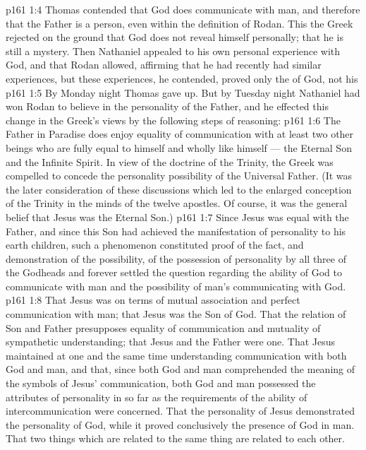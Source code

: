 \vs p161 1:4 Thomas contended that God does communicate with man, and therefore that the Father is a person, even within the definition of Rodan. This the Greek rejected on the ground that God does not reveal himself personally; that he is still a mystery. Then Nathaniel appealed to his own personal experience with God, and that Rodan allowed, affirming that he had recently had similar experiences, but these experiences, he contended, proved only the  of God, not his 
\vs p161 1:5 By Monday night Thomas gave up. But by Tuesday night Nathaniel had won Rodan to believe in the personality of the Father, and he effected this change in the Greek’s views by the following steps of reasoning:
\vs p161 1:6 \bibnobreakspace The Father in Paradise does enjoy equality of communication with at least two other beings who are fully equal to himself and wholly like himself --- the Eternal Son and the Infinite Spirit. In view of the doctrine of the Trinity, the Greek was compelled to concede the personality possibility of the Universal Father. (It was the later consideration of these discussions which led to the enlarged conception of the Trinity in the minds of the twelve apostles. Of course, it was the general belief that Jesus was the Eternal Son.)
\vs p161 1:7 \bibnobreakspace Since Jesus was equal with the Father, and since this Son had achieved the manifestation of personality to his earth children, such a phenomenon constituted proof of the fact, and demonstration of the possibility, of the possession of personality by all three of the Godheads and forever settled the question regarding the ability of God to communicate with man and the possibility of man’s communicating with God.
\vs p161 1:8 \bibnobreakspace That Jesus was on terms of mutual association and perfect communication with man; that Jesus was the Son of God. That the relation of Son and Father presupposes equality of communication and mutuality of sympathetic understanding; that Jesus and the Father were one. That Jesus maintained at one and the same time understanding communication with both God and man, and that, since both God and man comprehended the meaning of the symbols of Jesus’ communication, both God and man possessed the attributes of personality in so far as the requirements of the ability of intercommunication were concerned. That the personality of Jesus demonstrated the personality of God, while it proved conclusively the presence of God in man. That two things which are related to the same thing are related to each other.
